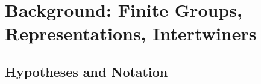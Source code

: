 %
%

\chapter{Background: Finite Groups, Representations, Intertwiners}
\label{chap:background}

\section{Hypotheses and Notation}

